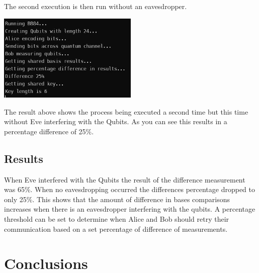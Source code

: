 \documentclass{article}
\begin{document}
The second execution is then run without an eavesdropper.

\vspace{5mm}

\includegraphics[width=0.5\textwidth]{BB84Output2.jpg}

\vspace{5mm}

The result above shows the process being executed a second time but this time without Eve interfering with the Qubits. As you can see this results in a percentage difference of 25\%.

\subsection{Results}
When Eve interfered with the Qubits the result of the difference measurement was 65\%. When no eavesdropping occurred the differences percentage dropped to  only 25\%. This shows that the amount of difference in bases comparisons increases when there is an eavesdropper interfering with the qubits. A percentage threshold can be set to determine when Alice and Bob should retry their communication based on a set percentage of difference of measurements.

\section{Conclusions}
\end{document}

